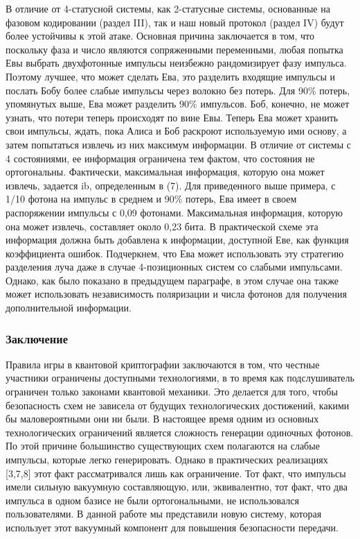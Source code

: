 В отличие от 4-статусной системы, как 2-статусные системы, основанные на фазовом кодировании (раздел III), так и наш новый протокол (раздел IV) будут более устойчивы к этой атаке. Основная причина заключается в том, что поскольку фаза и число являются сопряженными переменными, любая попытка Евы выбрать двухфотонные импульсы неизбежно рандомизирует фазу импульса. Поэтому лучшее, что может сделать Ева, это разделить входящие импульсы и послать Бобу более слабые импульсы через волокно без потерь. Для 90\% потерь, упомянутых выше, Ева может разделить 90\% импульсов. Боб, конечно, не может узнать, что потери теперь происходят по вине Евы. Теперь Ева может хранить свои импульсы, ждать, пока Алиса и Боб раскроют используемую ими основу, а затем попытаться извлечь из них максимум информации. В отличие от системы с 4 состояниями, ее информация ограничена тем фактом, что состояния не ортогональны. Фактически, максимальная информация, которую она может извлечь, задается ib, определенным в (7). Для приведенного выше примера, с 1/10 фотона на импульс в среднем и 90\% потерь, Ева имеет в своем распоряжении импульсы с 0,09 фотонами. Максимальная информация, которую она может извлечь, составляет около 0,23 бита. В практической схеме эта информация должна быть добавлена к информации, доступной Еве, как функция коэффициента ошибок. Подчеркнем, что Ева может использовать эту стратегию разделения луча даже в случае 4-позиционных систем со слабыми импульсами. Однако, как было показано в предыдущем параграфе, в этом случае она также может использовать независимость поляризации и числа фотонов для получения дополнительной информации. 


\subsubsection{Заключение}

Правила игры в квантовой криптографии заключаются в том, что честные участники ограничены доступными технологиями, в то время как подслушиватель ограничен только законами квантовой механики. Это делается для того, чтобы безопасность схем не зависела от будущих технологических достижений, какими бы маловероятными они ни были. В настоящее время одним из основных технологических ограничений является сложность генерации одиночных фотонов. По этой причине большинство существующих схем полагаются на слабые импульсы, которые легко генерировать. Однако в практических реализациях [3,7,8] этот факт рассматривался лишь как ограничение. Тот факт, что импульсы имели сильную вакуумную составляющую, или, эквивалентно, тот факт, что два импульса в одном базисе не были ортогональными, не использовался пользователями. В данной работе мы представили новую систему, которая использует этот вакуумный компонент для повышения безопасности передачи.


